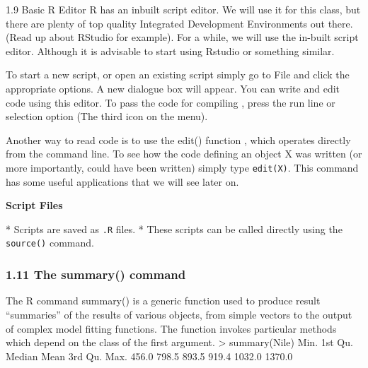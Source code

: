  
 1.9 Basic R Editor
 R has an inbuilt script editor. We will use it for this class, but there are plenty of top quality
 Integrated Development Environments out there. (Read up about RStudio for example).
 For a while, we will use the in-built script editor. Although it is advisable to start using Rstudio or something similar.
 
 
 
 
 
 To start a new script, or open an existing script simply go to File and click the appropriate
 options. A new dialogue box will appear. You can write and edit code using this editor.
 To pass the code for compiling , press the run line or selection option (The third icon
 on the menu).
 
 
 
 
 Another way to read code is to use the edit() function , which operates directly from the
 command line. To see how the code defining an object X was written (or more importantly,
 could have been written) simply type \texttt{edit(X)}. This command has some useful applications
 that we will see later on.
 
 
 
 
 \textbf{Script Files}
 
*  Scripts are saved as \texttt{.R} files. 
*  These scripts can be called directly using the \texttt{source()} command.

 
 
 
 
 \frametitle{1.11 The summary() command}
 The R command summary() is a generic function used to produce result “summaries” of the
 results of various objects, from simple vectors to the output of complex model fitting functions.
 The function invokes particular methods which depend on the class of the first argument.
 > summary(Nile)
 Min. 1st Qu. Median Mean 3rd Qu. Max.
 456.0 798.5 893.5 919.4 1032.0 1370.0
 
